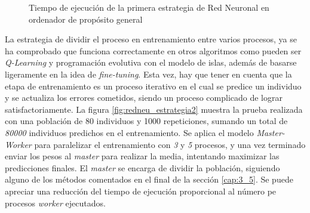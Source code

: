 			\begin{figure}[!h]
				\centering
				\caption{Tiempo de ejecución de la primera estrategia de Red Neuronal en ordenador de propósito general}
				\label{fig:redneu_estrategia1}
			\end{figure}

			
			

			La estrategia de dividir el proceso en entrenamiento entre varios procesos, ya se ha comprobado que funciona correctamente en otros algoritmos como pueden ser \textit{Q-Learning} y programación evolutiva con el modelo de islas, además de basarse ligeramente en la idea de \textit{fine-tuning}. Esta vez, hay que tener en cuenta que la etapa de entrenamiento es un proceso iterativo en el cual se predice un individuo y se actualiza los errores cometidos, siendo un proceso complicado de lograr satisfactoriamente. La figura \ref{fig:redneu_estrategia2} muestra la prueba realizada con una población de 80 individuos y 1000 repeticiones, sumando un total de \textit{80000} individuos predichos en el entrenamiento. Se aplica el modelo \textit{Master-Worker} para paralelizar el entrenamiento con \textit{3} y \textit{5} procesos, y una vez terminado enviar los pesos al \textit{master} para realizar la media, intentando maximizar las predicciones finales. El \textit{master} se encarga de dividir la población, siguiendo alguno de los métodos comentados en el final de la sección \ref{cap:3_5}. Se puede apreciar una reducción del tiempo de ejecución proporcional al número pe procesos \textit{worker} ejecutados.
		

